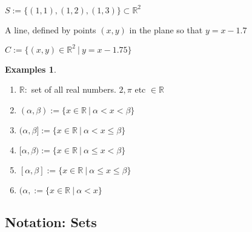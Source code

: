 \documentclass[twocolumn,20pt,fleqn]{extarticle}
\newcommand{\alert}[1]{{\color{red} #1}}
\newcommand{\sep}{\vspace{0.5cm}}
\theoremstyle{plain}
\theoremstyle{definition}
\newtheorem*{exmpls}{Examples}
\theoremstyle{remark}
\newenvironment*{examples}{\begin{exmpls} ~ \begin{enumerate}}{\end{enumerate}\end{exmpls}}
\begin{document}
\newpage

 $ S:= \{(1,1), (1,2), (1,3)\}  \subset \mathbb{R}^2 $  
\sep


















A line, defined by  \alert{points $(x,y)$} \alert{in the plane}  \alert{so that} \alert{$y = x - 1.7$} 


$ C:= \{(x,y) \in \mathbb{R}^2 \ |\ y = x - 1.75 \}$
 

\sep

\begin{examples}
\item $\mathbb{R}:$ set of all real numbers. $2, \pi \textrm{ etc } \in \mathbb{R}$
  \item $ (\alpha,  \beta) := \{x \in \mathbb{R} \ |\  \alpha < x  < \beta \}$
  
  
  \item $ (\alpha,  \beta] := \{x \in \mathbb{R} \ |\  \alpha < x  \leq \beta \}$
  
  
  \item $ [\alpha,  \beta) := \{x \in \mathbb{R} \ |\  \alpha \leq x  < \beta \}$
  
  
  \item $ [\alpha,  \beta] := \{x \in \mathbb{R} \ |\  \alpha \leq x  \leq \beta \}$
  
  
  \item $ (\alpha,  := \{x \in \mathbb{R} \ |\  \alpha < x \}$
  
  \end{examples}



\clearpage


\subsection{Notation: Sets}


\end{document}
